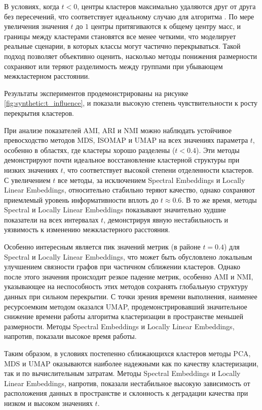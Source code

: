             В условиях, когда \(t < 0\), центры кластеров максимально удаляются друг от друга без пересечений, что соответствует идеальному случаю для алгоритма \kmeans{}. По мере увеличения значения \(t\) до \(1\) центры притягиваются к общему центру масс, и границы между кластерами становятся все менее четкими, что моделирует реальные сценарии, в которых классы могут частично перекрываться. Такой подход позволяет объективно оценить, насколько методы понижения размерности сохраняют или теряют разделимость между группами при убывающем межкластерном расстоянии.

            Результаты экспериментов продемонстрированы на рисунке \ref{fig:synthetic:t_influence}, и показали высокую степень чувствительности к росту перекрытия кластеров.

            При анализе показателей AMI, ARI и NMI можно наблюдать устойчивое превосходство методов MDS, ISOMAP и UMAP на всех значениях параметра \(t\), особенно в областях, где кластеры хорошо разделены (\(t < 0.4\)). Эти методы демонстрируют почти идеальное восстановление кластерной структуры при низких значениях \(t\), что соответствует высокой степени отделенности кластеров. С увеличением \(t\) все методы, за исключением Spectral Embeddings и Locally Linear Embeddings, относительно стабильно теряют качество, однако сохраняют приемлемый уровень информативности вплоть до \(t \approx 0.6\). В то же время, методы Spectral и Locally Linear Embeddings показывают значительно худшие показатели на всех интервалах \(t\), демонстрируя явную нестабильность и уязвимость к изменению межкластерного расстояния.

            Особенно интересным является пик значений метрик (в районе \(t = 0.4\)) для Spectral и Locally Linear Embeddings, что может быть обусловлено локальным улучшением связности графов при частичном сближении кластеров. Однако после этого значения происходит резкое падение метрик, особенно AMI и NMI, указывающее на неспособность этих методов сохранять глобальную структуру данных при сильном перекрытии. С точки зрения времени выполнения, наименее ресурсоемким методом оказался UMAP, продемонстрировавший значительное снижение времени работы алгоритма кластеризации в пространстве меньшей размерности. Методы Spectral Embeddings и Locally Linear Embeddings, напротив, показали высокое время работы.

            Таким образом, в условиях постепенно сближающихся кластеров методы PCA, MDS и UMAP оказываются наиболее надежными как по качеству кластеризации, так и по вычислительным затратам. Методы Spectral Embeddings и Locally Linear Embeddings, напротив, показали нестабильное высокую зависимость от расположения данных в пространстве и склонность к деградации качества при низком и высоком значениях \(t\).

